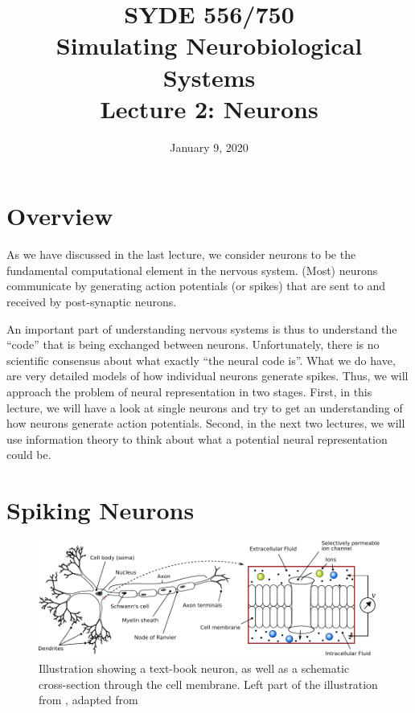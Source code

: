 \documentclass[10pt,letterpaper,oneside]{article}
\date{January 9, 2020}
\title{SYDE 556/750 \\ Simulating Neurobiological Systems \\ Lecture 2: Neurons}
\begin{document}

\section{Overview}

As we have discussed in the last lecture, we consider neurons to be the fundamental computational element in the nervous system. (Most) neurons communicate by generating action potentials (or spikes) that are sent to and received by post-synaptic neurons.

An important part of understanding nervous systems is thus to understand the \enquote{code} that is being exchanged between neurons. Unfortunately, there is no scientific consensus about what exactly \enquote{the neural code is}. What we do have, are very detailed models of how individual neurons generate spikes. Thus, we will approach the problem of neural representation in two stages. First, in this lecture, we will have a look at single neurons and try to get an understanding of how neurons generate action potentials. Second, in the next two lectures, we will use information theory to think about what a potential neural representation could be.

\section{Spiking Neurons}


\begin{figure}[t]
	\centering
	\includegraphics{media/neuron_sketch_membrane.pdf}
	\caption{Illustration showing a text-book neuron, as well as a schematic cross-section through the cell membrane. Left part of the illustration from \cite{stoeckel2015design}, adapted from \cite{kandel2012principles}}
	\label{fig:neuron_sketch_membrane}
\end{figure}
\end{document}
